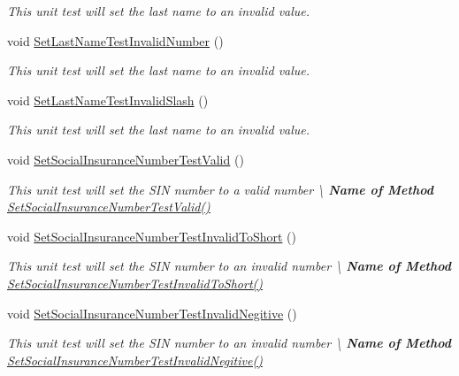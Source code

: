\begin{DoxyCompactItemize}
\begin{DoxyCompactList}\small\item\em This unit test will set the last name to an invalid value. \end{DoxyCompactList}\item 
void \hyperlink{class_my_all_employee_1_1_tests_1_1_employee_tests_a30f22d9b4911bf2d1b8c489415bcd131}{Set\+Last\+Name\+Test\+Invalid\+Number} ()
\begin{DoxyCompactList}\small\item\em This unit test will set the last name to an invalid value. \end{DoxyCompactList}\item 
void \hyperlink{class_my_all_employee_1_1_tests_1_1_employee_tests_a6e548af8211151455c40c7a20756b9b1}{Set\+Last\+Name\+Test\+Invalid\+Slash} ()
\begin{DoxyCompactList}\small\item\em This unit test will set the last name to an invalid value. \end{DoxyCompactList}\item 
void \hyperlink{class_my_all_employee_1_1_tests_1_1_employee_tests_a3b5dae6ba3605c07bf85753fba24ce3e}{Set\+Social\+Insurance\+Number\+Test\+Valid} ()
\begin{DoxyCompactList}\small\item\em This unit test will set the S\+I\+N number to a valid number \textbackslash{} {\bfseries  Name of Method} \hyperlink{class_my_all_employee_1_1_tests_1_1_employee_tests_a3b5dae6ba3605c07bf85753fba24ce3e}{Set\+Social\+Insurance\+Number\+Test\+Valid()} \end{DoxyCompactList}\item 
void \hyperlink{class_my_all_employee_1_1_tests_1_1_employee_tests_aa7fed107bfc06f9e2e2e11767b1d2c07}{Set\+Social\+Insurance\+Number\+Test\+Invalid\+To\+Short} ()
\begin{DoxyCompactList}\small\item\em This unit test will set the S\+I\+N number to an invalid number \textbackslash{} {\bfseries  Name of Method} \hyperlink{class_my_all_employee_1_1_tests_1_1_employee_tests_aa7fed107bfc06f9e2e2e11767b1d2c07}{Set\+Social\+Insurance\+Number\+Test\+Invalid\+To\+Short()} \end{DoxyCompactList}\item 
void \hyperlink{class_my_all_employee_1_1_tests_1_1_employee_tests_ab7c711e3bd0579655e6a96a395cfd19e}{Set\+Social\+Insurance\+Number\+Test\+Invalid\+Negitive} ()
\begin{DoxyCompactList}\small\item\em This unit test will set the S\+I\+N number to an invalid number \textbackslash{} {\bfseries  Name of Method} \hyperlink{class_my_all_employee_1_1_tests_1_1_employee_tests_ab7c711e3bd0579655e6a96a395cfd19e}{Set\+Social\+Insurance\+Number\+Test\+Invalid\+Negitive()} \end{DoxyCompactList}\item 

\end{DoxyCompactItemize}
